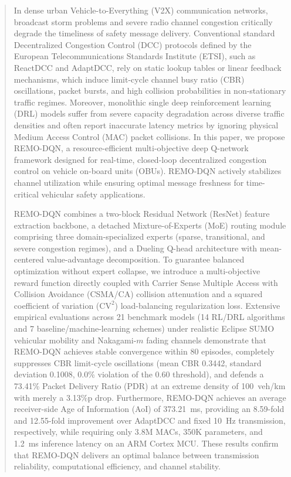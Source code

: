 \documentclass[journal]{IEEEtran}
\begin{document}
\begin{abstract}
In dense urban Vehicle-to-Everything (V2X) communication networks, broadcast storm problems and severe radio channel congestion critically degrade the timeliness of safety message delivery. Conventional standard Decentralized Congestion Control (DCC) protocols defined by the European Telecommunications Standards Institute (ETSI), such as ReactDCC and AdaptDCC, rely on static lookup tables or linear feedback mechanisms, which induce limit-cycle channel busy ratio (CBR) oscillations, packet bursts, and high collision probabilities in non-stationary traffic regimes. Moreover, monolithic single deep reinforcement learning (DRL) models suffer from severe capacity degradation across diverse traffic densities and often report inaccurate latency metrics by ignoring physical Medium Access Control (MAC) packet collisions. In this paper, we propose REMO-DQN, a resource-efficient multi-objective deep Q-network framework designed for real-time, closed-loop decentralized congestion control on vehicle on-board units (OBUs). REMO-DQN actively stabilizes channel utilization while ensuring optimal message freshness for time-critical vehicular safety applications.

REMO-DQN combines a two-block Residual Network (ResNet) feature extraction backbone, a detached Mixture-of-Experts (MoE) routing module comprising three domain-specialized experts (sparse, transitional, and severe congestion regimes), and a Dueling Q-head architecture with mean-centered value-advantage decomposition. To guarantee balanced optimization without expert collapse, we introduce a multi-objective reward function directly coupled with Carrier Sense Multiple Access with Collision Avoidance (CSMA/CA) collision attenuation and a squared coefficient of variation ($\text{CV}^2$) load-balancing regularization loss. Extensive empirical evaluations across 21 benchmark models (14 RL/DRL algorithms and 7 baseline/machine-learning schemes) under realistic Eclipse SUMO vehicular mobility and Nakagami-$m$ fading channels demonstrate that REMO-DQN achieves stable convergence within 80 episodes, completely suppresses CBR limit-cycle oscillations (mean CBR 0.3442, standard deviation 0.1008, 0.0\% violation of the 0.60 threshold), and defends a 73.41\% Packet Delivery Ratio (PDR) at an extreme density of 100~veh/km with merely a 3.13\%p drop. Furthermore, REMO-DQN achieves an average receiver-side Age of Information (AoI) of 373.21~ms, providing an 8.59-fold and 12.55-fold improvement over AdaptDCC and fixed 10~Hz transmission, respectively, while requiring only 3.8M MACs, 350K parameters, and 1.2~ms inference latency on an ARM Cortex MCU. These results confirm that REMO-DQN delivers an optimal balance between transmission reliability, computational efficiency, and channel stability.
\end{abstract}
\end{document}
